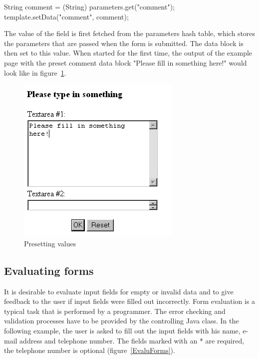 \begin{xml}
String comment = (String) parameters.get("comment");\\
template.setData("comment", comment);\\
\end{xml}

The value of the field is first fetched from the parameters hash table,
which stores the parameters that are passed when the form is submitted.
The data block is then set to this value. When started for the first
time, the output of the example page with the preset comment data block
"Please fill in something here!" would look like in figure~\ref{TypeIn1}.

\begin{figure}
\begin{center}
\includegraphics[clip,width=0.5\linewidth]{pics/modules/40}
\end{center}
\caption[Presetting values pic1]{Presetting values}
\label{TypeIn1}
\end{figure}


\subsection {Evaluating forms}

It is desirable to evaluate input fields for empty or invalid data and
to give feedback to the user if input fields were filled out incorrectly.
Form evaluation is a typical task that is performed by a programmer.
The error checking and validation processes have to be provided by the
controlling Java class. In the following example, the user is asked to
fill out the input fields with his name, e-mail address and telephone
number. The fields marked with an * are required, the telephone number
is optional (figure~\ref{EvaluForms}).

